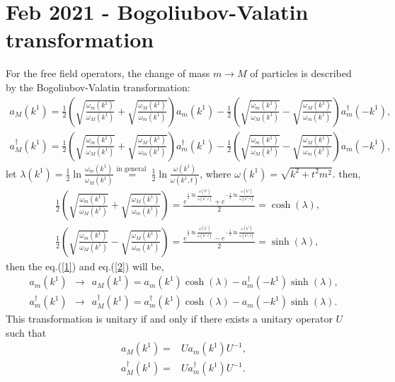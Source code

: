 \documentclass[]{article}
\numberwithin{equation}{section}
\begin{document}
\section{Feb  2021 - Bogoliubov-Valatin transformation}	
For the free field operators, the change of mass $m\rightarrow M$ of particles is
described by the Bogoliubov-Valatin transformation:
\begin{align}
    a_M(k^1)=\frac{1}{2}\left(\sqrt{\frac{\omega_m(k^1)}{\omega_M(k^1)}}+\sqrt{\frac{\omega_M(k^1)}{\omega_m(k^1)}}\right)a_m(k^1)-\frac{1}{2}\left(\sqrt{\frac{\omega_m(k^1)}{\omega_M(k^1)}}-\sqrt{\frac{\omega_M(k^1)}{\omega_m(k^1)}}\right)a^{\dagger}_m(-k^1),\label{1}\\
    a^{\dagger}_M(k^1)=\frac{1}{2}\left(\sqrt{\frac{\omega_m(k^1)}{\omega_M(k^1)}}+\sqrt{\frac{\omega_M(k^1)}{\omega_m(k^1)}}\right)a^{\dagger}_m(k^1)-\frac{1}{2}\left(\sqrt{\frac{\omega_m(k^1)}{\omega_M(k^1)}}-\sqrt{\frac{\omega_M(k^1)}{\omega_m(k^1)}}\right)a_m(-k^1),\label{2}
\end{align}
let $\lambda(k^1)=\frac{1}{2}\ln\frac{\omega_m(k^1)}{\omega_M(k^1)}\stackrel{\text{in general }}{=}\frac{1}{2}\ln\frac{\omega(k^1)}{\omega(k^1,t)}$, where $\omega(k^1)=\sqrt{k^2+t^2m^2}$. then,
\begin{align}
    &\frac{1}{2}\left(\sqrt{\frac{\omega_m(k^1)}{\omega_M(k^1)}}+\sqrt{\frac{\omega_M(k^1)}{\omega_m(k^1)}}\right)=\frac{e^{\frac{1}{2}\ln\frac{\omega(k^1)}{\omega(k^1,t)}}+e^{-\frac{1}{2}\ln\frac{\omega(k^1)}{\omega(k^1,t)}}}{2}=\cosh{(\lambda)},\\
    &\frac{1}{2}\left(\sqrt{\frac{\omega_m(k^1)}{\omega_M(k^1)}}-\sqrt{\frac{\omega_M(k^1)}{\omega_m(k^1)}}\right)=\frac{e^{\frac{1}{2}\ln\frac{\omega(k^1)}{\omega(k^1,t)}}-e^{-\frac{1}{2}\ln\frac{\omega(k^1)}{\omega(k^1,t)}}}{2}=\sinh{(\lambda)},
\end{align}
then the eq.(\ref{1}) and eq.(\ref{2}) will be,
\begin{align}
    a_m(k^1) ~~\longrightarrow~~ a_M(k^1)=a_m(k^1)\cosh{(\lambda)}-a^{\dagger}_m(-k^1)\sinh{(\lambda)}\label{a_m},\\
    a^{\dagger}_m(k^1) ~~\longrightarrow~~ a^{\dagger}_M(k^1)=a^{\dagger}_m(k^1)\cosh{(\lambda)}-a_m(-k^1)\sinh{(\lambda)}.
\end{align}
This transformation is unitary if and only if there exists a unitary operator $U$ such that
\begin{align}
    a_M(k^1) =& U a_m(k^1) U^{-1},\\
a^{\dagger}_M(k^1) =& U a^{\dagger}_m(k^1) U^{-1}.
\end{align}
\end{document}

